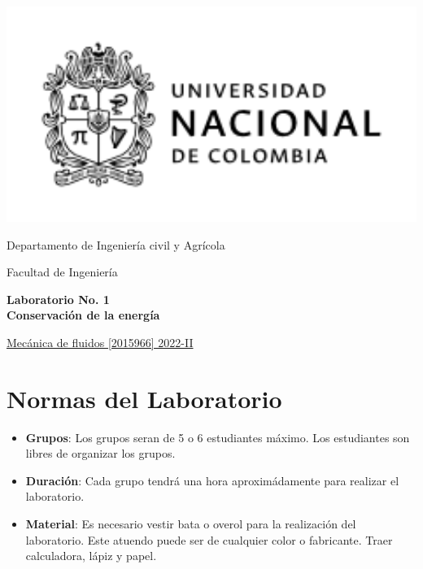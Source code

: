 \documentclass[10pt, a4paper]{exam}
\begin{document}
	\noindent
	\begin{minipage}[l]{0.1\textwidth}
		\noindent
		\includegraphics[width=2.8\textwidth]{ESCUDO.png}
	\end{minipage}
\hfill
\begin{minipage}[c]{0.8\textwidth}
	\begin{center}
		{\large  Departamento de Ingeniería civil y Agrícola\par
		\large	Facultad de Ingeniería	\par
    \large \textbf{Laboratorio No. 1 \\ Conservaci\'on de la energ\'ia}	\par
} %
	\end{center}
\end{minipage}
\par
\vspace{0.2in}
\noindent
    \uline{Mecánica de fluidos [2015966]	\hfill 2022-II	}
\par 
\vspace{0.15in}
\noindent

\section{Normas del Laboratorio}
\begin{itemize}
    \item \textbf{Grupos}: Los grupos seran de 5 o 6 estudiantes m\'aximo. Los estudiantes son libres de organizar los grupos.
    \item \textbf{Duraci\'on}: Cada grupo tendr\'a una hora aproxim\'adamente  para realizar el laboratorio.
    \item \textbf{Material}: Es necesario vestir bata o overol para la realizaci\'on del laboratorio. Este atuendo puede ser de cualquier color o fabricante. Traer calculadora, l\'apiz y papel.
\end{itemize}
\end{document}
